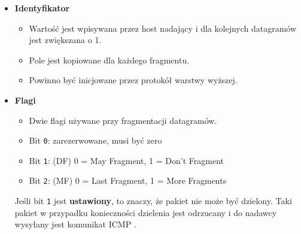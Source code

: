 \documentclass[../sk-egzamin.tex]{subfiles}
\begin{document}
\begin{itemize}
    \item \textbf{Identyfikator} 
    \begin{itemize}
        \item Wartość jest wpisywana przez host nadający i dla kolejnych
        datagramów jest zwiększana o 1.
        \item Pole jest  kopiowane dla każdego fragmentu.
        \item Powinno być inicjowane przez protokół warstwy wyższej.
    \end{itemize}
    \item \textbf{Flagi} 
    \begin{itemize}
        \item Dwie flagi używane przy fragmentacji datagramów.
        \item Bit \texttt{0}: zarezerwowane, musi być zero
        \item Bit \texttt{1}: (DF) 0 = May Fragment, 1 = Don't Fragment
        \item Bit \texttt{2}: (MF) 0 = Last Fragment, 1 = More Fragments\\
    \end{itemize}

    Jeśli bit \texttt{1} jest \textbf{ustawiony}, to znaczy,
    że pakiet nie może być dzielony.
    Taki pakiet w przypadku konieczności dzielenia jest odrzucany i do nadawcy
    wysyłany jest komunikat ICMP
    .


\end{itemize}
\end{document}
